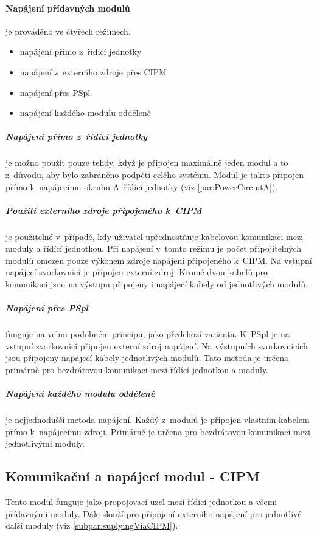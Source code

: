 \paragraph{Napájení přídavných modulů}
je prováděno ve čtyřech režimech.
\begin{itemize}
    \item napájení přímo z~řídící jednotky
    \item napájení z~externího zdroje přes CIPM
    \item napájení přes PSpl
    \item napájení každého modulu odděleně
\end{itemize}

\subparagraph{Napájení přimo z~řídící jednotky}
je možno použít pouze tehdy, když je připojen maximálně jeden modul a to z~důvodu, aby bylo zabráněno podpětí celého systému.
Modul je takto připojen přímo k~napájecímu okruhu A~řídící jednotky (viz \autoref{par:PowerCircuitA}).

\subparagraph{Použití externího zdroje připojeného k~CIPM}
\label{subpar:suplyingViaCIPM}
je použitelné v~případě, kdy uživatel upřednostňuje kabelovou komunikaci mezi moduly a řídící jednotkou.
Při napájení v~tomto režimu je počet připojitelných modulů omezen pouze výkonem zdroje napájení připojeného k~CIPM.
Na vstupní napájecí svorkovnici je připojen externí zdroj. 
Kromě dvou kabelů pro komunikaci jsou na výstupu připojeny i napájecí kabely od jednotlivých modulů.

\subparagraph{Napájení přes PSpl}
funguje na velmi podobném principu, jako předchozí varianta. 
K~PSpl je na vstupní svorkovnici připojen externí zdroj napájení.
Na výstupních svorkovnicích jsou připojeny napájecí kabely jednotlivých modulů.
Tato metoda je určena primárně pro bezdrátovou komunikaci mezi řídící jednotkou a moduly.

\subparagraph{Napájení každého modulu odděleně}
je nejjednodušší metoda napájení.
Každý z~modulů je připojen vlastním kabelem přímo k~napájecímu zdroji.
Primárně je určena pro bezdrátovou komunikaci mezi jednotlivými moduly. 

\subsection{Komunikační a napájecí modul - CIPM}
\label{subsec:CIPM}
Tento modul funguje jako propojovací uzel mezi řídící jednotkou a všemi přídavnými moduly.
Dále slouží pro připojení externího napájení pro jednotlivé další moduly (viz \autoref{subpar:suplyingViaCIPM}).

